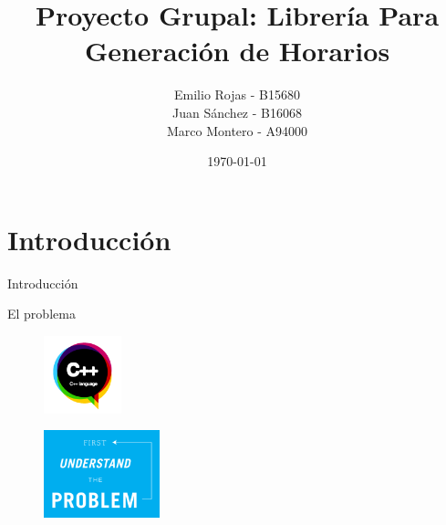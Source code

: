 \documentclass[10pt]{beamer}
\title{Proyecto Grupal: Librería Para Generación de Horarios}
\subtitle{}  %
\date{\today}
\author{
Emilio Rojas - B15680\\
  Juan Sánchez - B16068\\
  Marco Montero - A94000\\
  \href{mailto:}{{\tt}}
}
\institute[
  IE0217 - Estructuras de datos abstractas y algoritmos\\
  Escuela de Ingenieria Eléctrica\\
  Universidad de Costa Rica
] %
{%
  IE0217 - Estructuras de datos abstractas y algoritmos\\\
  Escuela de Ingenieria Eléctrica\\
  Universidad de Costa Rica

}
\begin{document}
\aauwavesbg

\begin{frame} %
\titlepage
\end{frame}


%









\section{Introducción}

\begin{frame}{Introducción}{}
\begin{block}{}
	 El problema
\begin{figure}[!h]
 \begin{flushleft}
\includegraphics[width=0.2\textwidth]{./AAUgraphics/cburbuja.png}
\end{flushleft}
\end{figure}

\begin{figure}[!h]
 \begin{flushright}
 \includegraphics[width=0.3\textwidth]{./AAUgraphics/problem1.png}
 \end{flushright}
\end{figure}

\end{block}
\end{frame}
\end{document}
